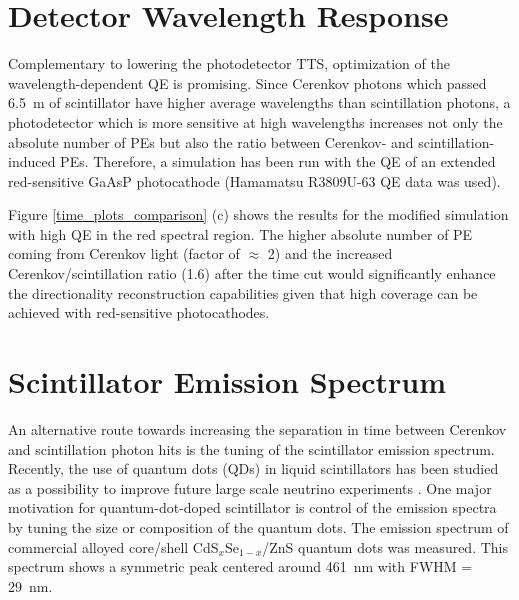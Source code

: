 \documentclass[aps,prc,twocolumn,groupedaddress,showpacs,amsmath,amssymb,floatfix,superscriptaddress]{revtex4}
\begin{document}
\section{Detector Wavelength Response}
\label{detector_wavelength_response_sec} 
Complementary to lowering the photodetector TTS, optimization of the wavelength-dependent QE is promising. Since Cerenkov photons which passed 6.5~m of scintillator have higher average wavelengths than scintillation photons, a photodetector which is more sensitive at high wavelengths increases not only the absolute number of PEs but also the ratio between Cerenkov- and scintillation-induced PEs. Therefore, a simulation has been run with the QE of an extended red-sensitive GaAsP photocathode (Hamamatsu R3809U-63 QE data was used).

Figure \ref{time_plots_comparison} (c) shows the results for the modified simulation with high QE in the red spectral region. The higher absolute number of PE coming from Cerenkov light (factor of $\approx$ 2) and the increased Cerenkov/scintillation ratio (1.6) after the time cut would significantly enhance the directionality reconstruction capabilities given that high coverage can be achieved with red-sensitive photocathodes.  

\section{Scintillator Emission Spectrum}
\label{scintillator_emission_sec}
An alternative route towards increasing the separation in time between Cerenkov and scintillation photon hits is the tuning of the scintillator emission spectrum. Recently, the use of quantum dots (QDs) in liquid scintillators has been studied as a possibility to improve future large scale neutrino experiments \cite{qdot2}. One major motivation for quantum-dot-doped scintillator is control of the emission spectra by tuning the size or composition of the quantum dots. The emission spectrum of commercial alloyed core/shell CdS$_x$Se$_{1-x}$/ZnS quantum dots was measured. This spectrum shows a symmetric peak centered around 461~nm with FWHM = 29~nm. 
\end{document}
